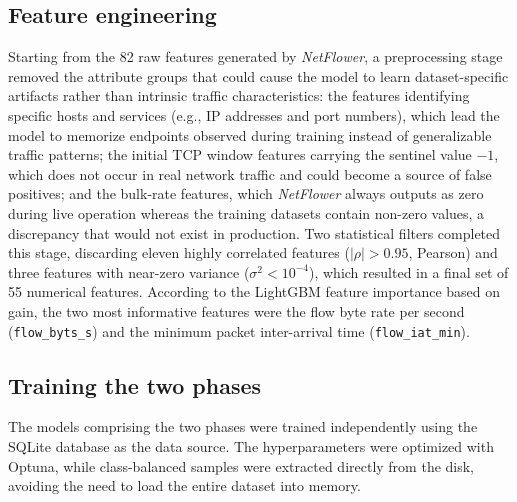 \documentclass[conference]{IEEEtran}
\begin{document}
\subsection{Feature engineering}
\label{subsec:features}

Starting from the 82 raw features generated by \textit{NetFlower}, a preprocessing stage removed the attribute groups that could cause the model to learn dataset-specific artifacts rather than intrinsic traffic characteristics: the features identifying specific hosts and services (e.g., IP addresses and port numbers), which lead the model to memorize endpoints observed during training instead of generalizable traffic patterns; the initial TCP window features carrying the sentinel value $-1$, which does not occur in real network traffic and could become a source of false positives; and the bulk-rate features, which \textit{NetFlower} always outputs as zero during live operation whereas the training datasets contain non-zero values, a discrepancy that would not exist in production. Two statistical filters completed this stage, discarding eleven highly correlated features ($|\rho| > 0.95$, Pearson) and three features with near-zero variance ($\sigma^2 < 10^{-4}$), which resulted in a final set of 55 numerical features. According to the LightGBM feature importance based on gain, the two most informative features were the flow byte rate per second (\texttt{flow\_byts\_s}) and the minimum packet inter-arrival time (\texttt{flow\_iat\_min}).


\subsection{Training the two phases}
\label{subsec:training}

The models comprising the two phases were trained independently using the SQLite database as the data source. The hyperparameters were optimized with Optuna, while class-balanced samples were extracted directly from the disk, avoiding the need to load the entire dataset into memory.
\end{document}
